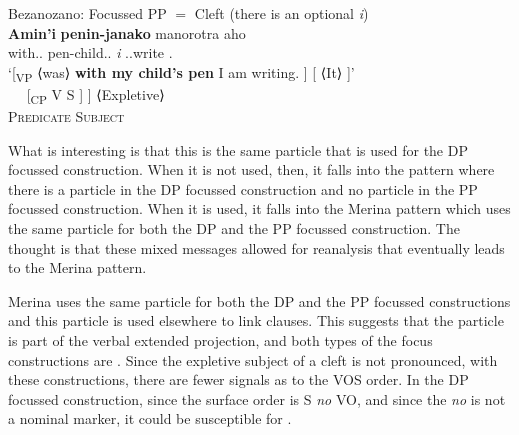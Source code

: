 \documentclass[output=paper]{langsci/langscibook}
\begin{document}
\ea  Bezanozano: Focussed PP $=$ Cleft (there is an optional \emph{i})\\
    \ea
    \gll \textbf{Amin'i} \textbf{penin-janako}  manorotra aho\\
    with.\Gen{}.\Det{} pen-child.\Fsg.\Gen{} \emph{i} \Prs.\At{}.write \Fsg{}.\Nom{}\\
    \glt `[\textsubscript{VP} ⟨was⟩ \textbf{with my child's pen}  I am writing. ] [ ⟨It⟩ ]' \\
    \ex
        \gll {$[$\textsubscript{VP} ⟨\Cop{⟩} PP} {~~} {[\textsubscript{CP}  V} {S ] ] ⟨Expletive⟩}\\
            {\textsc{Predicate}} {} {} {\textsc{Subject}}\\
    \z
\z

What is interesting is that this is the same particle that is used for the DP
focussed construction.  When it is not used, then, it falls into the
 pattern where there is a particle in the DP focussed construction
and no particle in the PP focussed construction.  When it is used, it falls
into the Merina pattern which uses the same particle for both the DP and the PP
focussed construction.  The thought is that these mixed messages allowed for
reanalysis that eventually leads to the Merina pattern.

Merina uses the same particle for both the DP and the PP focussed constructions
and this particle is used elsewhere to link clauses.  This suggests that the
particle is part of the verbal extended projection, and both types of the focus
constructions are .  Since the expletive subject of a
cleft is not pronounced, with these constructions, there are fewer
signals as to the VOS order.  In the DP focussed construction, since the
surface order is S \emph{no} VO, and since the \emph{no} is not a nominal
marker, it could be susceptible for .
\end{document}
